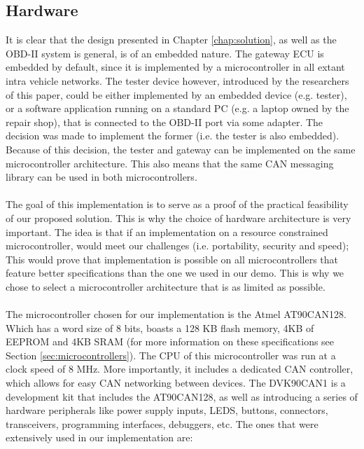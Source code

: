\subsection{Hardware}
\label{sec:hardware}
It is clear that the design presented in Chapter \ref{chap:solution}, as well as the OBD-II system is general, is of an embedded nature. The gateway ECU is embedded by default, since it is implemented by a microcontroller in all extant intra vehicle networks. The tester device however, introduced by the researchers of this paper, could be either implemented by an embedded device (e.g. tester), or a software application running on a standard PC (e.g. a laptop owned by the repair shop), that is connected to the OBD-II port via some adapter. The decision was made to implement the former (i.e. the tester is also embedded). Because of this decision, the tester and gateway can be implemented on the same microcontroller architecture. This also means that the same CAN messaging library can be used in both microcontrollers.\\ \\ The goal of this implementation is to serve as a proof of the practical feasibility of our proposed solution. This is why the choice of hardware architecture is very important. The idea is that if an implementation on a resource constrained microcontroller, would meet our challenges (i.e. portability, security and speed); This would prove that implementation is possible on all microcontrollers that feature better specifications than the one we used in our demo. This is why we chose to select a microcontroller architecture that is as limited as possible.  \\ \\ The microcontroller chosen for our implementation is the Atmel AT90CAN128. Which has a word size of 8 bits, boasts a 128 KB flash memory, 4KB of EEPROM and 4KB SRAM (for more information on these specifications see  Section \ref{sec:microcontrollers}). The CPU of this microcontroller was run at a clock speed of 8 MHz. More importantly, it includes a dedicated CAN controller, which allows for easy CAN networking between devices. The DVK90CAN1 is a development kit that includes the AT90CAN128, as well as introducing a series of hardware peripherals like power supply inputs, LEDS, buttons, connectors, transceivers, programming interfaces, debuggers, etc. The ones that were extensively used in our implementation are:
